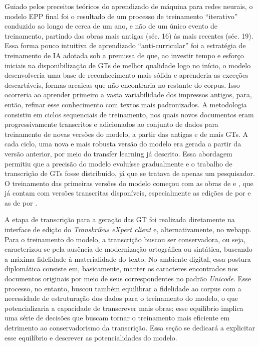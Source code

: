 \documentclass[portuguese]{textolivre}
\begin{document}
Guiado pelos preceitos teóricos do aprendizado de máquina para redes neurais, o modelo EPP final foi o resultado de um processo de treinamento “iterativo” conduzido ao longo de cerca de um ano, e não de um único evento de treinamento, partindo das obras mais antigas (séc. 16) às mais recentes (séc. 19). Essa forma pouco intuitiva de aprendizado “anti-curricular” \cite[p.~103]{bengio2009learning} foi a estratégia de treinamento de IA adotada sob a premissa de que, ao investir tempo e esforço iniciais na disponibilização de GTs de melhor qualidade logo no início, o modelo desenvolveria uma base de reconhecimento mais sólida e aprenderia as exceções descartáveis, formas arcaicas que não encontraria no restante do corpus. Isso ocorreria ao aprender primeiro a vasta variabilidade dos impressos antigos, para, então, refinar esse conhecimento com textos mais padronizados. A metodologia consistiu em ciclos sequenciais de treinamento, nos quais novos documentos eram progressivamente transcritos e adicionados ao conjunto de dados para treinamento de novas versões do modelo, a partir das antigas e de mais GTs. A cada ciclo, uma nova e mais robusta versão do modelo era gerada a partir da versão anterior, por meio do transfer learning já descrito. Essa abordagem permitiu que a precisão do modelo evoluísse gradualmente e o trabalho de transcrição de GTs fosse distribuído, já que se tratava de apenas um pesquisador. O treinamento das primeiras versões do modelo começou com as obras de \textcite{barros1540grammatica} e \textcite{oliveira1536grammatica}, que já contam com versões transcritas disponíveis, especialmente as edições de \textcite{barros1540grammatica} por \textcite{machado1957joaodebarros} e as de \textcite{oliveira1536grammatica} por \textcite{buescu1975gramatica}.

A etapa de transcrição para a geração das GT foi realizada diretamente na interface de edição do \textit{Transkribus eXpert client} e, alternativamente, no webapp. Para o treinamento do modelo, a transcrição buscou ser conservadora, ou seja, caracterizou-se pela ausência de modernização ortográfica ou sintática, buscando a máxima fidelidade à materialidade do texto. No ambiente digital, essa postura diplomática consiste em, basicamente, manter os caracteres encontrados nos documentos originais por meio de seus correspondentes no padrão \textit{Unicode}. Esse processo, no entanto, buscou também equilibrar a fidelidade ao corpus com a necessidade de estruturação dos dados para o treinamento do modelo, o que potencializaria a capacidade de transcrever mais obras; esse equilíbrio implica uma série de decisões que buscam tornar o treinamento mais eficiente em detrimento ao conservadorismo da transcrição. Essa seção se dedicará a explicitar esse equilíbrio e descrever as potencialidades do modelo.
\end{document}
